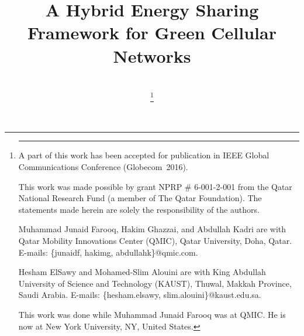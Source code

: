 \documentclass[10pt, letter,twocolumn]{IEEEtran}
\begin{document}
\title{A Hybrid Energy Sharing Framework for Green Cellular Networks\vspace{-0.0cm}}
\author{\\

\thanks{\vspace{-0.0cm}\hrule \vspace{0.0cm}
\noindent A part of this work has been accepted for publication in IEEE Global Communications Conference (Globecom~2016).

\noindent This work was made possible by grant NPRP \# 6-001-2-001 from the Qatar National Research Fund (a member of The Qatar Foundation). The statements made herein are solely the responsibility of the authors.

\noindent Muhammad Junaid Farooq, Hakim Ghazzai, and Abdullah Kadri are with Qatar Mobility Innovations Center (QMIC), Qatar University, Doha, Qatar. E-mails: \{junaidf, hakimg, abdullahk\}@qmic.com.

\noindent Hesham ElSawy and Mohamed-Slim Alouini are with King Abdullah University of Science and Technology (KAUST), Thuwal, Makkah Province, Saudi Arabia. E-mails: \{hesham.elsawy, slim.alouini\}@kaust.edu.sa.

\noindent This work was done while Muhammad Junaid Farooq was at QMIC. He is now at New York University, NY, United States.
}

}
\end{document}
